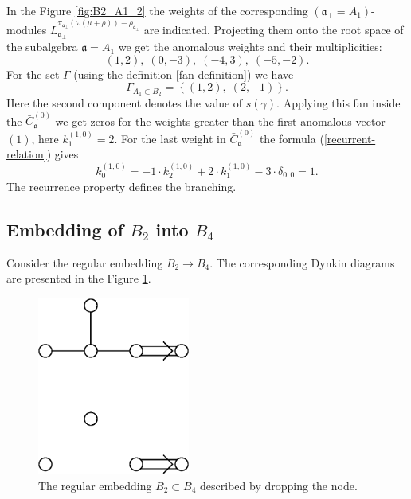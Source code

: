 \documentclass[12pt]{iopart}
\theoremstyle{definition}
\theoremstyle{definition}
\theoremstyle{definition}
\begin{document}
In the Figure \ref{fig:B2_A1_2} the weights of the corresponding
$\left(\mathfrak{a}_{\bot}=A_1\right)$-modules
$L^{\pi_{\mathfrak{a}_{\bot}}(\omega(\mu+\rho))-\rho_{\mathfrak{a}_{\bot}}}_{\mathfrak{a}_{\bot}}$
are indicated. Projecting them onto the root space of the subalgebra $\mathfrak{a}=A_1$
we get the anomalous weights and their multiplicities:
\begin{equation*}
  \label{eq:25}
  (1,2),\; (0,-3),\; (-4,3),\; (-5,-2).
\end{equation*}
For the set $\Gamma$ (using the definition \ref{fan-definition}) we have
\begin{equation*}
  \label{eq:22}
  \Gamma_{A_1\subset B_2}=\left\{ (1,2),\; (2,-1) \right\}.
\end{equation*}
Here the second component denotes the value of $s(\gamma)$.
Applying this fan inside the $\bar{C}^{(0)}_{\mathfrak{a}}$ we get zeros for the weights
greater than the first anomalous vector $(1)$, here $k^{(1,0)}_1=2$. For the last weight in $\bar{C}^{(0)}_{\mathfrak{a}}$ the formula (\ref{recurrent-relation}) gives
\begin{equation*}
  \label{eq:23}
  k^{(1,0)}_{0}=-1\cdot k^{(1,0)}_2 +2\cdot k^{(1,0)}_1 - 3\cdot \delta_{0,0} = 1.
\end{equation*}
The recurrence property defines the branching.

\subsection{Embedding of $B_2$ into $B_4$}
\label{sec:someth-high-dimens}
Consider the regular embedding $B_2 \longrightarrow B_4$.
The corresponding Dynkin diagrams are presented in the Figure \ref{fig:dynkin}.
\begin{figure}[h]
  \centering
  \includegraphics[width=50mm]{figure3.eps}
  \caption{The regular embedding $B_2\subset B_4$ described by dropping the node.}
  \label{fig:dynkin}
\end{figure}
\end{document}
